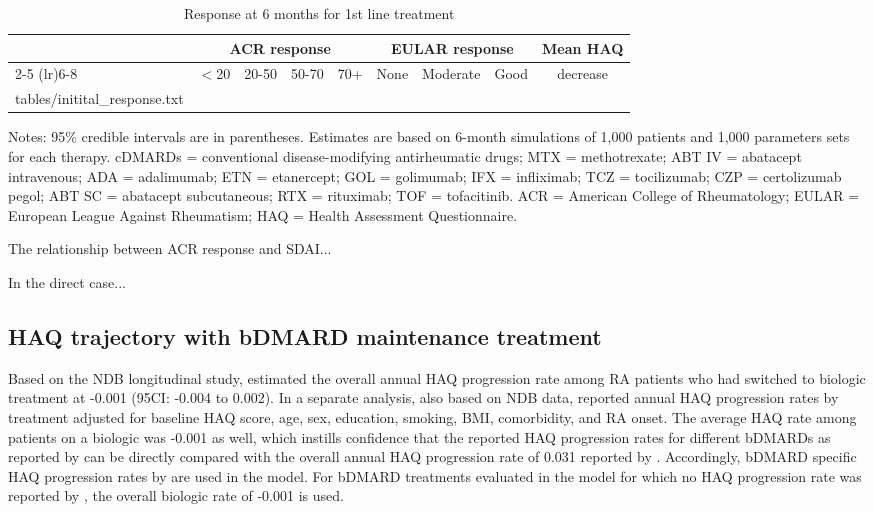 \documentclass[11pt,final,fleqn]{article}\usepackage[]{graphicx}\usepackage[]{color}
\makeatletter
\theoremstyle{plain}
\newcommand*\ExpandableInput[1]{\@@input#1 }
\makeatother
\begin{document}
\begin{landscape}
\begin{table}[!ht]
\begin{center}
\begin{threeparttable}
\caption{Response at 6 months for 1st line treatment} \label{tbl:initial-haq}
\scriptsize
\begin{tabular}{lrrrrrrrr}
\hline
\multicolumn{1}{c}{} & \multicolumn{4}{c}{ACR response} & \multicolumn{3}{c}{EULAR response} & \multicolumn{1}{c}{\multirow{2}{*}{Mean HAQ}}\\
\cmidrule(lr){2-5} \cmidrule(lr){6-8}
\multicolumn{1}{l}{Treatment} & \multicolumn{1}{c}{$<$20} & \multicolumn{1}{c}{20-50} & \multicolumn{1}{c}{50-70}  & \multicolumn{1}{c}{70+}   & \multicolumn{1}{c}{None} & \multicolumn{1}{c}{Moderate}  & \multicolumn{1}{c}{Good}  & \multicolumn{1}{c}{decrease}\\
\hline
\ExpandableInput{tables/initital_response.txt}
\hline
\end{tabular}
\tiny
Notes: 95\% credible intervals are in parentheses. Estimates are based on 6-month simulations of 1,000 patients and 1,000 parameters sets for each therapy. cDMARDs = conventional disease-modifying antirheumatic drugs; MTX = methotrexate; ABT IV = abatacept intravenous; ADA = adalimumab; ETN = etanercept; GOL = golimumab; IFX = infliximab; TCZ = tocilizumab; CZP = certolizumab pegol; ABT SC = abatacept subcutaneous; RTX = rituximab; TOF = tofacitinib. ACR = American College of Rheumatology; EULAR = European League Against Rheumatism; HAQ = Health Assessment Questionnaire. 
\end{threeparttable}
\end{center}
\end{table}
\end{landscape}

The relationship between ACR response and SDAI...

In the direct case...

\subsection{HAQ trajectory with bDMARD maintenance treatment}
Based on the NDB longitudinal study, \citet{wolfe2010loss} estimated the overall annual HAQ progression rate among RA patients who had switched to biologic treatment at -0.001 (95CI: -0.004 to 0.002). In a separate analysis, also based on NDB data, \citet{michaud2011treatment} reported annual HAQ progression rates by treatment adjusted for baseline HAQ score, age, sex, education, smoking, BMI, comorbidity, and RA onset. The average HAQ rate among patients on a biologic was -0.001 as well, which instills confidence that the reported HAQ progression rates for different bDMARDs as reported by \citet{michaud2011treatment} can be directly compared with the overall annual HAQ progression rate of 0.031 reported by \citet{wolfe2010loss}. Accordingly, bDMARD specific HAQ progression rates by \citet{michaud2011treatment} are used in the model. For bDMARD treatments evaluated in the model for which no HAQ progression rate was reported by \citet{michaud2011treatment}, the overall biologic rate of -0.001 is used. 
\end{document}
